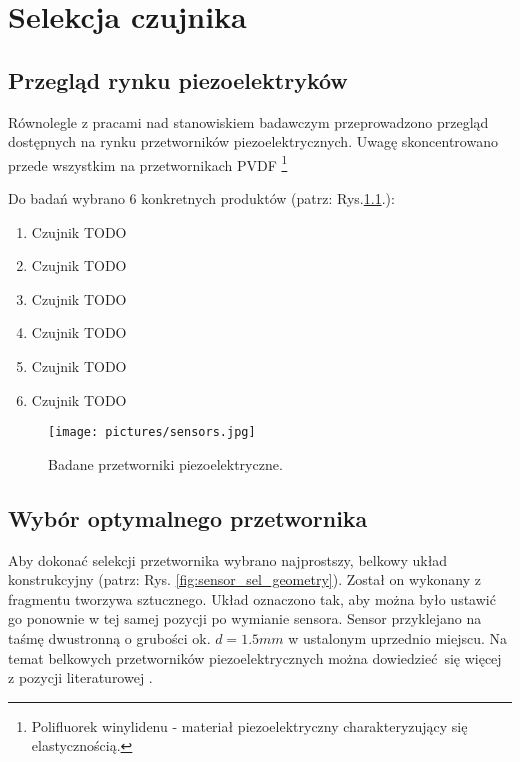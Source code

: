 \chapter{Selekcja czujnika}
\label{sec:sensor_selection}

\section{Przegląd rynku piezoelektryków}
\label{sec:piezoelectric_research}

Równolegle z pracami nad stanowiskiem badawczym przeprowadzono przegląd dostępnych
na rynku przetworników piezoelektrycznych. Uwagę skoncentrowano przede wszystkim 
na przetwornikach PVDF
\footnote{Polifluorek winylidenu - 
materiał piezoelektryczny charakteryzujący się elastycznością.}

Do badań wybrano 6 konkretnych produktów (patrz: Rys.\ref{fig:sensors}.):

\begin{enumerate}
\item Czujnik TODO
\item Czujnik TODO
\item Czujnik TODO
\item Czujnik TODO
\item Czujnik TODO
\item Czujnik TODO
\end{enumerate}


\begin{figure}[htpb]
\centering
\texttt{[image: pictures/sensors.jpg]}
\caption{Badane przetworniki piezoelektryczne.}
\label{fig:sensors}
\end{figure}

\section{Wybór optymalnego przetwornika}
\label{sec:optimal_piezoelectric_selection}

Aby dokonać selekcji przetwornika wybrano najprostszy, belkowy układ konstrukcyjny 
(patrz: Rys. \ref{fig:sensor_sel_geometry}). Został on wykonany z fragmentu 
tworzywa sztucznego. Układ oznaczono tak, aby można było ustawić go ponownie 
w tej samej pozycji po wymianie sensora. Sensor przyklejano na taśmę dwustronną 
o grubości ok. $ d = 1.5 mm$ w ustalonym uprzednio miejscu. Na temat
belkowych przetworników piezoelektrycznych można dowiedzieć się więcej 
z pozycji literaturowej \cite{belkowy_sensor}. 

